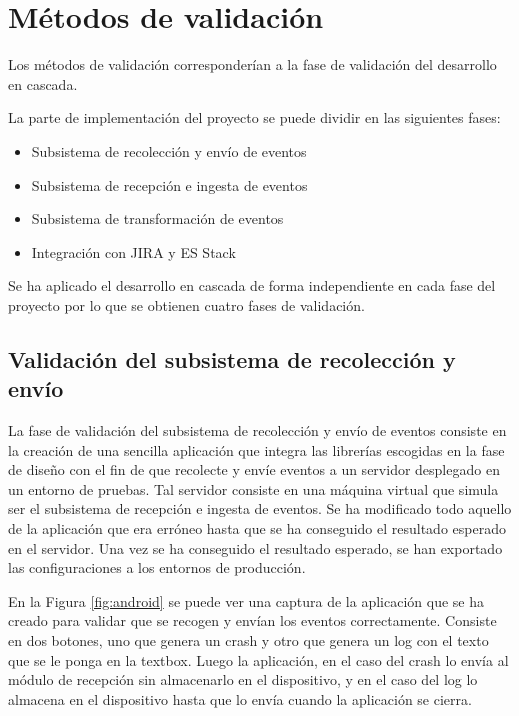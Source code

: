 \section{Métodos de validación}

Los métodos de validación corresponderían a la fase de validación del desarrollo en cascada.

La parte de implementación del proyecto se puede dividir en las siguientes fases:

\begin{itemize}
	\item Subsistema de recolección y envío de eventos
	\item Subsistema de recepción e ingesta de eventos
	\item Subsistema de transformación de eventos
	\item Integración con JIRA y ES Stack
\end{itemize}

Se ha aplicado el desarrollo en cascada de forma independiente en cada fase del proyecto por lo que se obtienen cuatro fases de validación.

\subsection{Validación del subsistema de recolección y envío}
La fase de validación del subsistema de recolección y envío de eventos consiste en la creación de una sencilla aplicación que integra las librerías escogidas en la fase de diseño con el fin de que recolecte y envíe eventos a un servidor desplegado en un entorno de pruebas. Tal servidor consiste en una máquina virtual que simula ser el subsistema de recepción e ingesta de eventos. Se ha modificado todo aquello de la aplicación que era erróneo hasta que se ha conseguido el resultado esperado en el servidor. Una vez se ha conseguido el resultado esperado, se han exportado las configuraciones a los entornos de producción.


En la Figura \ref{fig:android} se puede ver una captura de la aplicación que se ha creado para validar que se recogen y envían los eventos correctamente. Consiste en dos botones, uno que genera un crash y otro que genera un log con el texto que se le ponga en la textbox. Luego la aplicación, en el caso del crash lo envía al módulo de recepción sin almacenarlo en el dispositivo, y en el caso del log lo almacena en el dispositivo hasta que lo envía cuando la aplicación se cierra.

